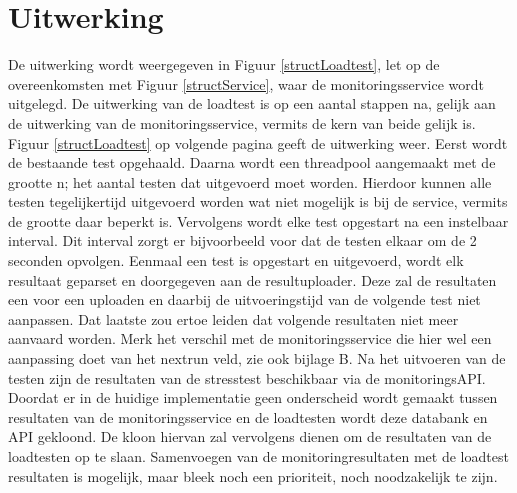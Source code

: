 \section{Uitwerking}
\npar
De uitwerking wordt weergegeven in Figuur \ref{structLoadtest}, let op de overeenkomsten met Figuur \ref{structService}, waar de monitoringsservice wordt uitgelegd. De uitwerking van de loadtest is op een aantal stappen na, gelijk aan de uitwerking van de monitoringsservice, vermits de kern van beide gelijk is. 
\npar
Figuur \ref{structLoadtest} op volgende pagina geeft de uitwerking weer. Eerst wordt de bestaande test opgehaald. Daarna wordt een threadpool aangemaakt met de grootte n; het aantal testen dat uitgevoerd moet worden. Hierdoor kunnen alle testen tegelijkertijd uitgevoerd worden wat niet mogelijk is bij de service, vermits de grootte daar beperkt is. Vervolgens wordt elke test opgestart na een instelbaar interval. Dit interval zorgt er bijvoorbeeld voor dat de testen elkaar om de 2 seconden opvolgen.
\npar
Eenmaal een test is opgestart en uitgevoerd, wordt elk resultaat geparset en doorgegeven aan de resultuploader. Deze zal de resultaten een voor een uploaden en daarbij de uitvoeringstijd van de volgende test niet aanpassen. Dat laatste zou ertoe leiden dat volgende resultaten niet meer aanvaard worden. Merk het verschil met de monitoringsservice die hier wel een aanpassing doet van het nextrun veld, zie ook bijlage B.
\npar
Na het uitvoeren van de testen zijn de resultaten van de stresstest beschikbaar via de monitoringsAPI. Doordat er in de huidige implementatie geen onderscheid wordt gemaakt tussen resultaten van de monitoringsservice en de loadtesten wordt deze databank en API gekloond. De kloon hiervan zal vervolgens dienen om de resultaten van de loadtesten op te slaan. Samenvoegen van de monitoringresultaten met de loadtest resultaten is mogelijk, maar bleek noch een prioriteit, noch noodzakelijk te zijn.
